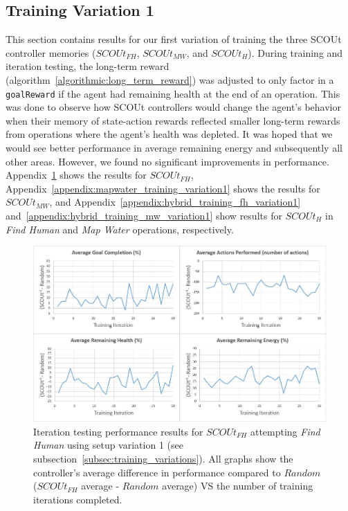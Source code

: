 \subsection{Training Variation 1}
This section contains results for our first variation of training the three SCOUt controller memories ($SCOUt_{FH}$, $SCOUt_{MW}$, and $SCOUt_{H}$).
During training and iteration testing, the long-term reward (algorithm~\ref{algorithmic:long_term_reward}) was adjusted to only factor in a \texttt{goalReward} if the agent had remaining health at the end of an operation.
This was done to observe how SCOUt controllers would change the agent's behavior when their memory of state-action rewards reflected smaller long-term rewards from operations where the agent's health was depleted.
It was hoped that we would see better performance in average remaining energy and subsequently all other areas.
However, we found no significant improvements in performance.
Appendix~\ref{appendix:findhuman_training_variation1} shows the results for $SCOUt_{FH}$, Appendix~\ref{appendix:mapwater_training_variation1} shows the results for $SCOUt_{MW}$, and Appendix~\ref{appendix:hybrid_training_fh_variation1} and~\ref{appendix:hybrid_training_mw_variation1} show results for $SCOUt_{H}$ in \textit{Find Human} and \textit{Map Water} operations, respectively.

\begin{appx}
\begin{figure}[H]
  \includegraphics[width=0.9\columnwidth]{Figures/Results/TrainingVariation1/FindHuman.JPG}
  \caption{Iteration testing performance results for $SCOUt_{FH}$ attempting \textit{Find Human} using setup variation 1 (see subsection~\ref{subsec:training_variations}). All graphs show the controller's average difference in performance compared to $Random$ ($SCOUt_{FH}$ average - $Random$ average) VS the number of training iterations completed.}
  \label{appendix:findhuman_training_variation1}
\end{figure}
\end{appx}


